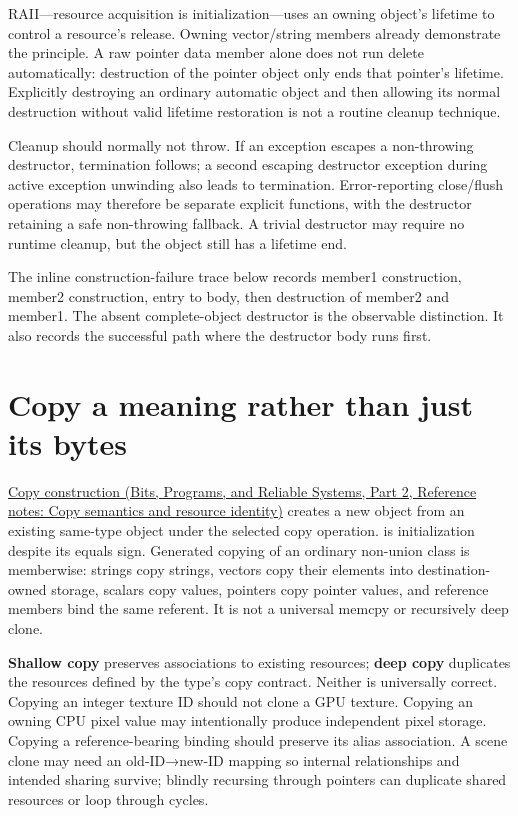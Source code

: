 RAII---resource acquisition is initialization---uses an owning object's lifetime to control a resource's release. Owning vector/string members already demonstrate the principle. A raw pointer data member alone does not run delete automatically: destruction of the pointer object only ends that pointer's lifetime. Explicitly destroying an ordinary automatic object and then allowing its normal destruction without valid lifetime restoration is not a routine cleanup technique.

Cleanup should normally not throw. If an exception escapes a non-throwing destructor, termination follows; a second escaping destructor exception during active exception unwinding also leads to termination. Error-reporting close/flush operations may therefore be separate explicit functions, with the destructor retaining a safe non-throwing fallback. A trivial destructor may require no runtime cleanup, but the object still has a lifetime end.

The inline construction-failure trace below records member1 construction, member2 construction, entry to body, then destruction of member2 and member1. The absent complete-object destructor is the observable distinction. It also records the successful path where the destructor body runs first.

\section{Copy a meaning rather than just its bytes}\label{05-engine-i-ch003-copy-a-meaning-rather-than-just-its-bytes}

\hypertarget{05-engine-i-ch003-copy-a-meaning-rather-than-just-its-bytes}{}

\href{../01-Bits-Programs-and-Reliable-Systems-P02/main.pdf\#nameddest=appendix-1340cd1ce582}{Copy construction (Bits, Programs, and Reliable Systems, Part 2, Reference notes: Copy semantics and resource identity)} creates a new object from an existing same-type object under the selected copy operation.  is initialization despite its equals sign. Generated copying of an ordinary non-union class is memberwise: strings copy strings, vectors copy their elements into destination-owned storage, scalars copy values, pointers copy pointer values, and reference members bind the same referent. It is not a universal memcpy or recursively deep clone.

\textbf{Shallow copy} preserves associations to existing resources; \textbf{deep copy} duplicates the resources defined by the type's copy contract. Neither is universally correct. Copying an integer texture ID should not clone a GPU texture. Copying an owning CPU pixel value may intentionally produce independent pixel storage. Copying a reference-bearing binding should preserve its alias association. A scene clone may need an old-ID→new-ID mapping so internal relationships and intended sharing survive; blindly recursing through pointers can duplicate shared resources or loop through cycles.


